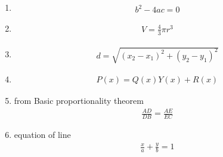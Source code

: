 \begin{enumerate}[label=\thesubsection.\arabic*, ref=\thesubsection.\theenumi]
\item 
\begin{align}
    b^2 -4ac =0 \label{eq:EE26BTECH11222-prob 1}
\end{align}

\item 
\begin{align}
    V=\frac{4}{3}\pi r^3 \label{eq:EE26BTECH11222-prob 3}
\end{align}

\item 
\begin{align}
    d=\sqrt{(x_2-x_1)^2+(y_2-y_1)^2} \label{eq:EE26BTECH11222-prob 4}
\end{align}

\item 
\begin{align}
    P(x)=Q(x)Y(x)+R(x) \label{eq:ee26btech11222-prob 6}
\end{align}

\item from Basic proportionality theorem
\begin{align}
    \frac{AD}{DB}=\frac{AE}{EC} \label{eq:ee26btech11222-prob_10 7}
\end{align}

\item equation of line 
\begin{align}
    \frac{x}{a} +\frac{y}{b}=1
\end{align}

\end{enumerate}

